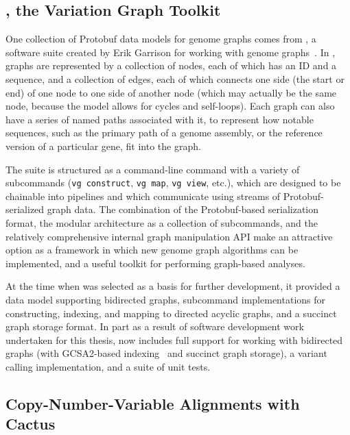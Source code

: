\subsection{\vg, the Variation Graph Toolkit}


One collection of Protobuf data models for genome graphs comes from \vg, a software suite created by Erik Garrison for working with genome graphs~\cite{garrison2016vg}. In \vg, graphs are represented by a collection of nodes, each of which has an ID and a sequence, and a collection of edges, each of which connects one side (the start or end) of one node to one side of another node (which may actually be the same node, because the \vg model allows for cycles and self-loops). Each graph can also have a series of named paths associated with it, to represent how notable sequences, such as the primary path of a genome assembly, or the reference version of a particular gene, fit into the graph.

The \vg suite is structured as a command-line \vg command with a variety of subcommands (\texttt{vg construct}, \texttt{vg map}, \texttt{vg view}, etc.), which are designed to be chainable into pipelines and which communicate using streams of Protobuf-serialized graph data. The combination of the Protobuf-based serialization format, the modular architecture as a collection of subcommands, and the relatively comprehensive internal graph manipulation API make \vg an attractive option as a framework in which new genome graph algorithms can be implemented, and a useful toolkit for performing graph-based analyses.

At the time when \vg was selected as a basis for further development, it provided a data model supporting bidirected graphs, subcommand implementations for constructing, indexing, and mapping to directed acyclic graphs, and a succinct graph storage format. In part as a result of software development work undertaken for this thesis, \vg now includes full support for working with bidirected graphs (with GCSA2-based indexing~\cite{siren2017indexing} and succinct graph storage), a variant calling implementation, and a suite of unit tests.

\subsection{Copy-Number-Variable Alignments with Cactus}

